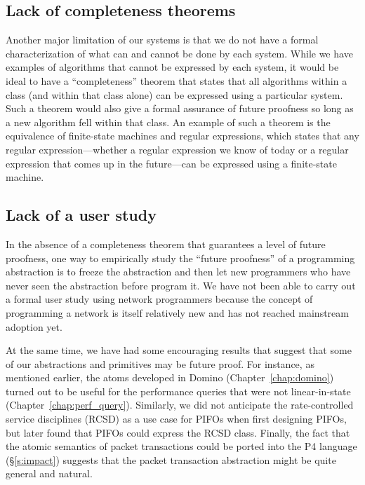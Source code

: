 
\subsection{Lack of completeness theorems}
\label{ss:limit_completeness}

Another major limitation of our systems is that we do not have a formal
characterization of what can and cannot be done by each system. While we have
examples of algorithms that cannot be expressed by each system, it would be
ideal to have a ``completeness'' theorem that states that all algorithms within
a class (and within that class alone) can be expressed using a particular
system. Such a theorem would also give a formal assurance of future proofness
so long as a new algorithm fell within that class. An example of such a theorem
is the equivalence of finite-state machines and regular expressions, which
states that any regular expression---whether a regular expression we know of
today or a regular expression that comes up in the future---can be expressed
using a finite-state machine.

\subsection{Lack of a user study} In the absence of a completeness theorem that
guarantees a level of future proofness, one way to empirically study the
``future proofness'' of a programming abstraction is to freeze the abstraction
and then let new programmers who have never seen the abstraction before program
it. We have not been able to carry out a formal user study using network
programmers because the concept of programming a network is itself relatively
new and has not reached mainstream adoption yet.

At the same time, we have had some encouraging results that suggest that some
of our abstractions and primitives may be future proof. For instance, as
mentioned earlier, the atoms developed in Domino (Chapter~\ref{chap:domino})
turned out to be useful for the performance queries that were not
linear-in-state (Chapter~\ref{chap:perf_query}). Similarly, we did not
anticipate the rate-controlled service disciplines (RCSD) as a use case for
PIFOs when first designing PIFOs, but later found that PIFOs could express the
RCSD class. Finally, the fact that the atomic semantics of  packet transactions
could be ported into the P4 language (\S\ref{s:impact}) suggests that the
packet transaction abstraction might be quite general and natural.

